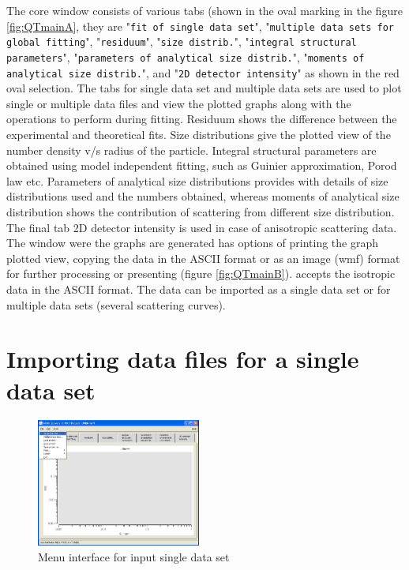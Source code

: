 \sloppy
The core \SASfit window consists of various tabs (shown in the oval
marking in the figure \ref{fig:QTmainA}, they are "\texttt{fit of single data set}",
"\texttt{multiple data sets for global fitting}", "\texttt{residuum}", "\texttt{size
distrib.}", "\texttt{integral structural parameters}", "\texttt{parameters of
analytical size distrib.}", "\texttt{moments of analytical size
distrib.}", and "\texttt{2D detector intensity}" as shown in the red oval
selection. The tabs for single data set and multiple data sets are used to
plot single or multiple data files and view the plotted graphs along
with the operations to perform during fitting. Residuum shows the
difference between the experimental and theoretical fits. Size
distributions give the plotted view of the number density v/s radius
of the particle. Integral structural parameters are obtained using
model independent fitting, such as Guinier approximation, Porod law
etc. Parameters of analytical size distributions provides with
details of size distributions used and the numbers obtained, whereas
moments of analytical size distribution shows the contribution of
scattering from different size distribution. The final tab 2D
detector intensity is used in case of anisotropic scattering data.
The window were the graphs are generated has options of printing the
graph plotted view, copying the data in the ASCII format or as an
image (wmf) format for further processing or presenting (figure
\ref{fig:QTmainB}). \SASfit accepts the isotropic data in the ASCII
format. The data can be imported as a single data set or for
multiple data sets (several scattering curves).

\section{Importing data files for a single data set}
\begin{figure}[htb]
\includegraphics[width=0.48\textwidth]{QTloadingSingleDS.png}
\caption{Menu interface for input single data set}
\label{fig:QTloadingSingleDS}
\end{figure}

